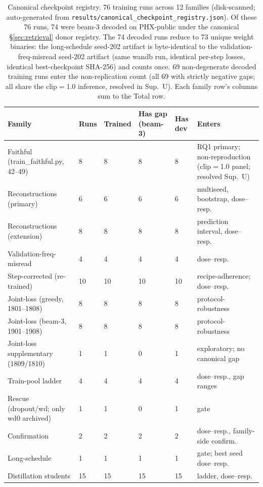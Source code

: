 \documentclass[pdflatex,sn-chicago]{sn-jnl}
\begin{document}
\begin{table}[h]
\centering
\scriptsize\setlength{\tabcolsep}{3pt}
\caption{Canonical checkpoint registry. 76 training runs across 12 families (disk-scanned; auto-generated from \texttt{results/canonical\_checkpoint\_registry.json}). Of these 76 runs, 74 were beam-3 decoded on PHX-public under the canonical \S\ref{sec:retrieval} donor registry. The 74 decoded runs reduce to 73 unique weight binaries: the long-schedule seed-202 artifact is byte-identical to the validation-freq-misread seed-202 artifact (same wandb run, identical per-step losses, identical best-checkpoint SHA-256) and counts once. 69 non-degenerate decoded training runs enter the non-replication count (all 69 with strictly negative gaps; all share the clip$=$1.0 inference, resolved in Sup.~U). Each family row's columns sum to the Total row.}
\label{tab:checkpoint_registry}
\begin{tabular}{p{4.2cm}p{1.0cm}p{1.5cm}p{1.4cm}p{1.4cm}p{3.0cm}}
\toprule
Family & Runs & Trained & Has gap (beam-3) & Has dev & Enters \\
\midrule
Faithful (train\_faithful.py, 42--49) & 8 & 8 & 8 & 8 & RQ1 primary; non-reproduction (clip$=$1.0 panel; resolved Sup.~U) \\
Reconstructions (primary) & 6 & 6 & 6 & 6 & multiseed, bootstrap, dose--resp. \\
Reconstructions (extension) & 8 & 8 & 8 & 8 & prediction interval, dose--resp. \\
Validation-freq-misread & 4 & 4 & 4 & 4 & dose--resp. \\
Step-corrected (re-trained) & 10 & 10 & 10 & 10 & recipe-adherence; dose--resp. \\
Joint-loss (greedy, 1801--1808) & 8 & 8 & 8 & 8 & protocol-robustness \\
Joint-loss (beam-3, 1901--1908) & 8 & 8 & 8 & 8 & protocol-robustness \\
Joint-loss supplementary (1809/1810) & 1 & 1 & 0 & 1 & exploratory; no canonical gap \\
Train-pool ladder & 4 & 4 & 4 & 4 & dose--resp., gap ranges \\
Rescue (dropout/wd; only wd0 archived) & 1 & 1 & 0 & 1 & gate \\
Confirmation & 2 & 2 & 2 & 2 & dose--resp., family-side confirm. \\
Long-schedule & 1 & 1 & 1 & 1 & gate; best seed dose--resp. \\
Distillation students & 15 & 15 & 15 & 15 & ladder, dose--resp. \\

\end{tabular}
\end{table}
\end{document}
